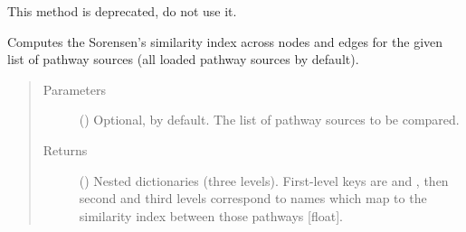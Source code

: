 \documentclass[letterpaper,10pt,english]{sphinxmanual}
\begin{document}
\begin{fulllineitems}

\begin{fulllineitems}
\label{\detokenize{main:pypath.main.PyPath.small_plot}}
This method is deprecated, do not use it.

\end{fulllineitems}


\begin{fulllineitems}
\label{\detokenize{main:pypath.main.PyPath.sorensen_pathways}}
Computes the Sorensen’s similarity index across nodes and edges
for the given list of pathway sources (all loaded pathway
sources by default).
\begin{quote}\begin{description}
\item[{Parameters}] \leavevmode
{} () \textendash{} Optional,  by default. The list of pathway sources
to be compared.

\item[{Returns}] \leavevmode
() \textendash{} Nested dictionaries (three levels). First-level
keys are  and , then second and third
levels correspond to  names which map
to the similarity index between those pathways {[}float{]}.

\end{description}\end{quote}

\end{fulllineitems}


\begin{fulllineitems}
\label{\detokenize{main:pypath.main.PyPath.source_diagram}}
\end{fulllineitems}


\end{fulllineitems}
\end{document}
